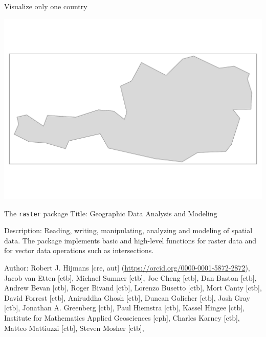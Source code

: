 \documentclass[
  ignorenonframetext,
]{beamer}
\newenvironment{Shaded}{\begin{snugshade}}{\end{snugshade}}
\newcommand{\KeywordTok}[1]{\textcolor[rgb]{0.13,0.29,0.53}{\textbf{#1}}}
\newcommand{\NormalTok}[1]{#1}
\newcommand{\OperatorTok}[1]{\textcolor[rgb]{0.81,0.36,0.00}{\textbf{#1}}}
\newcommand{\StringTok}[1]{\textcolor[rgb]{0.31,0.60,0.02}{#1}}
\begin{document}
\begin{frame}[fragile]{Visualize only one country}
\protect\hypertarget{visualize-only-one-country}{}
\begin{Shaded}
\end{Shaded}

\includegraphics{quick_high_quality_maps_files/figure-beamer/unnamed-chunk-16-1.pdf}
\end{frame}

\begin{frame}{The \texttt{raster} package}
\protect\hypertarget{the-raster-package}{}
Title: Geographic Data Analysis and Modeling

Description: Reading, writing, manipulating, analyzing and modeling of
spatial data. The package implements basic and high-level functions for
raster data and for vector data operations such as intersections.

Author: Robert J. Hijmans {[}cre, aut{]}
(\url{https://orcid.org/0000-0001-5872-2872}), Jacob van Etten
{[}ctb{]}, Michael Sumner {[}ctb{]}, Joe Cheng {[}ctb{]}, Dan Baston
{[}ctb{]}, Andrew Bevan {[}ctb{]}, Roger Bivand {[}ctb{]}, Lorenzo
Busetto {[}ctb{]}, Mort Canty {[}ctb{]}, David Forrest {[}ctb{]},
Aniruddha Ghosh {[}ctb{]}, Duncan Golicher {[}ctb{]}, Josh Gray
{[}ctb{]}, Jonathan A. Greenberg {[}ctb{]}, Paul Hiemstra {[}ctb{]},
Kassel Hingee {[}ctb{]}, Institute for Mathematics Applied Geosciences
{[}cph{]}, Charles Karney {[}ctb{]}, Matteo Mattiuzzi {[}ctb{]}, Steven
Mosher {[}ctb{]},
\end{frame}
\end{document}
